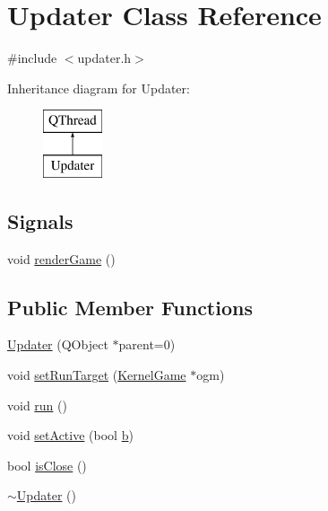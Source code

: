 \hypertarget{class_updater}{\section{Updater Class Reference}
\label{class_updater}
}


{\ttfamily \#include $<$updater.\-h$>$}

Inheritance diagram for Updater\-:\begin{figure}[H]
\begin{center}
\leavevmode
\includegraphics[height=2.000000cm]{class_updater}
\end{center}
\end{figure}
\subsection*{Signals}
\begin{DoxyCompactItemize}
\item 
void \hyperlink{class_updater_aa443259cbce530ab39679cbe0220ad55}{render\-Game} ()
\end{DoxyCompactItemize}
\subsection*{Public Member Functions}
\begin{DoxyCompactItemize}
\item 
\hyperlink{class_updater_adb60a473bc174de0ee06ee09c814e1a2}{Updater} (Q\-Object $\ast$parent=0)
\item 
void \hyperlink{class_updater_a98324b20b804c73f2cb33fc01afd29fb}{set\-Run\-Target} (\hyperlink{class_kernel_game}{Kernel\-Game} $\ast$ogm)
\item 
void \hyperlink{class_updater_abd76987a878910ff4687cac6cd63859d}{run} ()
\item 
void \hyperlink{class_updater_aa115005ac2d83eead9c9ffd00a2faae7}{set\-Active} (bool \hyperlink{jquery_8js_a2fa551895933fae935a0a6b87282241d}{b})
\item 
bool \hyperlink{class_updater_a055c8c65e3a0d7bd5af22f51f0541ba2}{is\-Close} ()
\item 
\hyperlink{class_updater_a2f8434a97a4f3d3c716bb05abb20621e}{$\sim$\-Updater} ()
\end{DoxyCompactItemize}


